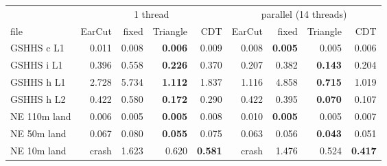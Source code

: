 \begin{tabular}{lrrrrrrrr}
\toprule
 & \multicolumn{4}{c}{1 thread} & \multicolumn{4}{c}{parallel (14 threads)} \\
\cmidrule(lr){2-5}\cmidrule(lr){6-9}
file & EarCut & fixed & Triangle & CDT & EarCut & fixed & Triangle & CDT \\
\midrule
GSHHS c L1 & 0.011 & 0.008 & \textbf{0.006} & 0.009 & 0.008 & \textbf{0.005} & 0.005 & 0.006 \\
GSHHS i L1 & 0.396 & 0.558 & \textbf{0.226} & 0.370 & 0.207 & 0.382 & \textbf{0.143} & 0.204 \\
GSHHS h L1 & 2.728 & 5.734 & \textbf{1.112} & 1.837 & 1.116 & 4.858 & \textbf{0.715} & 1.019 \\
GSHHS h L2 & 0.422 & 0.580 & \textbf{0.172} & 0.290 & 0.422 & 0.395 & \textbf{0.070} & 0.107 \\
NE 110m land & 0.006 & 0.005 & \textbf{0.005} & 0.008 & 0.010 & \textbf{0.005} & 0.005 & 0.007 \\
NE 50m land & 0.067 & 0.080 & \textbf{0.055} & 0.075 & 0.063 & 0.056 & \textbf{0.043} & 0.051 \\
NE 10m land & crash & 1.623 & 0.620 & \textbf{0.581} & crash & 1.476 & 0.524 & \textbf{0.417} \\
\bottomrule
\end{tabular}
